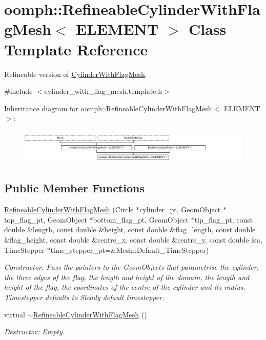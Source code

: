 \hypertarget{classoomph_1_1RefineableCylinderWithFlagMesh}{}\section{oomph\+:\+:Refineable\+Cylinder\+With\+Flag\+Mesh$<$ E\+L\+E\+M\+E\+NT $>$ Class Template Reference}
\label{classoomph_1_1RefineableCylinderWithFlagMesh}


Refineable version of \hyperlink{classoomph_1_1CylinderWithFlagMesh}{Cylinder\+With\+Flag\+Mesh}.  




{\ttfamily \#include $<$cylinder\+\_\+with\+\_\+flag\+\_\+mesh.\+template.\+h$>$}

Inheritance diagram for oomph\+:\+:Refineable\+Cylinder\+With\+Flag\+Mesh$<$ E\+L\+E\+M\+E\+NT $>$\+:\begin{figure}[H]
\begin{center}
\leavevmode
\includegraphics[height=1.681682cm]{classoomph_1_1RefineableCylinderWithFlagMesh}
\end{center}
\end{figure}
\subsection*{Public Member Functions}
\begin{DoxyCompactItemize}
\item 
\hyperlink{classoomph_1_1RefineableCylinderWithFlagMesh_ab5cca3144d26422aecc5aa709e8f1ff9}{Refineable\+Cylinder\+With\+Flag\+Mesh} (Circle $\ast$cylinder\+\_\+pt, Geom\+Object $\ast$top\+\_\+flag\+\_\+pt, Geom\+Object $\ast$bottom\+\_\+flag\+\_\+pt, Geom\+Object $\ast$tip\+\_\+flag\+\_\+pt, const double \&length, const double \&height, const double \&flag\+\_\+length, const double \&flag\+\_\+height, const double \&centre\+\_\+x, const double \&centre\+\_\+y, const double \&a, Time\+Stepper $\ast$time\+\_\+stepper\+\_\+pt=\&Mesh\+::\+Default\+\_\+\+Time\+Stepper)
\begin{DoxyCompactList}\small\item\em Constructor. Pass the pointers to the Geom\+Objects that parametrise the cylinder, the three edges of the flag, the length and height of the domain, the length and height of the flag, the coordinates of the centre of the cylinder and its radius. Timestepper defaults to Steady default timestepper. \end{DoxyCompactList}\item 
virtual \hyperlink{classoomph_1_1RefineableCylinderWithFlagMesh_a61744e809a7b7c74288273dfbc448751}{$\sim$\+Refineable\+Cylinder\+With\+Flag\+Mesh} ()
\begin{DoxyCompactList}\small\item\em Destructor\+: Empty. \end{DoxyCompactList}\end{DoxyCompactItemize}
